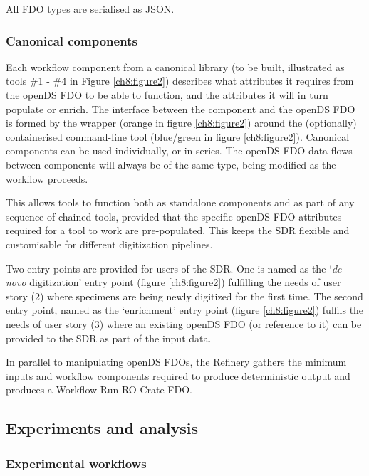 All \acrshort{FDO} types are serialised as \acrshort{JSON}.

\subsubsection{Canonical components}\label{canonical-components}

Each workflow component from a canonical library (to be built,
illustrated as tools \#1 - \#4 in Figure \vref{ch8:figure2}) describes what attributes it
requires from the openDS FDO to be able to function, and the attributes
it will in turn populate or enrich. The interface between the component
and the openDS FDO is formed by the wrapper (orange in figure \ref{ch8:figure2}) around
the (optionally) containerised command-line tool (blue/green in figure
\ref{ch8:figure2}). Canonical components can be used individually, or in series. The
openDS FDO data flows between components will always be of the same
type, being modified as the workflow proceeds.

This allows tools to function both as standalone components and as part
of any sequence of chained tools, provided that the specific openDS FDO
attributes required for a tool to work are pre-populated. This keeps the
\acrshort{SDR} flexible and customisable for different digitization pipelines.

Two entry points are provided for users of the SDR. One is named as the
`\emph{de novo} digitization' entry point (figure \ref{ch8:figure2}) fulfilling the
needs of user story (2) where specimens are being newly digitized for
the first time. The second entry point, named as the `enrichment' entry
point (figure \ref{ch8:figure2}) fulfils the needs of user story (3) where an existing
openDS FDO (or reference to it) can be provided to the SDR as part of
the input data.

In parallel to manipulating openDS FDOs, the Refinery gathers the
minimum inputs and workflow components required to produce deterministic
output and produces a Workflow-Run-RO-Crate FDO.

\subsection{Experiments and analysis}\label{experiments-and-analysis}

\subsubsection{Experimental workflows}\label{experimental-workflows}

